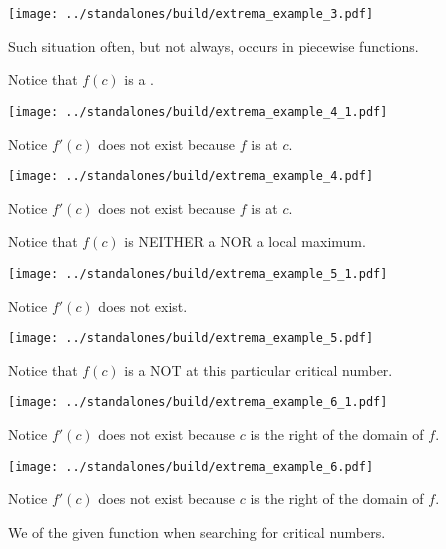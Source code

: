 \documentclass[12pt, handout]{beamer}
\begin{document}
\begin{frame}[t]
  \texttt{[image: ../standalones/build/extrema\_example\_3.pdf]}
  
  Such situation often, but not always, occurs in piecewise functions.

  \pause 
  Notice that \(f(c)\) is a .
\end{frame}



\begin{frame}[t]
  \texttt{[image: ../standalones/build/extrema\_example\_4\_1.pdf]}

  Notice \(f'(c)\) does not exist because \(f\) is  at \(c\). 
\end{frame}

\begin{frame}[t]
  \texttt{[image: ../standalones/build/extrema\_example\_4.pdf]}
  
  Notice \(f'(c)\) does not exist because \(f\) is  at \(c\). 
  \pause 

  Notice that \(f(c)\) is NEITHER a  NOR a local maximum.
\end{frame}


\begin{frame}[t]
  \texttt{[image: ../standalones/build/extrema\_example\_5\_1.pdf]}

  Notice \(f'(c)\) does not exist.
\end{frame}

\begin{frame}[t]
  \texttt{[image: ../standalones/build/extrema\_example\_5.pdf]}
  
  \pause 
  Notice that \(f(c)\) is a NOT  at this particular critical number.
\end{frame}


\begin{frame}[t]
  \texttt{[image: ../standalones/build/extrema\_example\_6\_1.pdf]}

  Notice \(f'(c)\) does not exist because \(c\) is the right  of the domain of \(f\).
\end{frame}

\begin{frame}[t]
  \texttt{[image: ../standalones/build/extrema\_example\_6.pdf]}
  
  Notice \(f'(c)\) does not exist because \(c\) is the right  of the domain of \(f\).

  \pause        
  \hlwarn{\faExclamationTriangle{}} We  of the given function when searching for critical numbers.
\end{frame}
\end{document}
